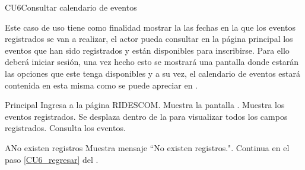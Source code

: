 \begin{UseCase}{CU6}{Consultar calendario de eventos}{
		\noindent Este caso de uso tiene como finalidad mostrar la las fechas en la que los eventos registrados se van a realizar, el actor pueda consultar en la página principal los eventos que han sido registrados y están disponibles para inscribirse. 
		Para ello deberá iniciar sesión, una vez hecho esto se mostrará una pantalla  donde estarán las opciones que este tenga disponibles y a su vez, el calendario de eventos estará contenida en esta misma como se puede apreciar en .
        
	} \label{CU6_evento}
		\end{UseCase}
	\pagebreak
	
    \begin{UCtrayectoria}{Principal}
    \UCpaso[\UCactor] Ingresa a la página RIDESCOM.
    \UCpaso Muestra la pantalla .
    \UCpaso Muestra los eventos registrados.   \label{CU6_regresar}
    \UCpaso[\UCactor] Se desplaza dentro de la  para visualizar todos los campos registrados.
	\UCpaso[\UCactor] Consulta los eventos. 
    \end{UCtrayectoria}

	\begin{UCtrayectoriaA}{A}{No existen registros}
		\UCpaso Muestra mensaje “No existen registros.".
		\UCpaso Continua en el paso \ref{CU6_regresar} del .
	\end{UCtrayectoriaA}
    

	


